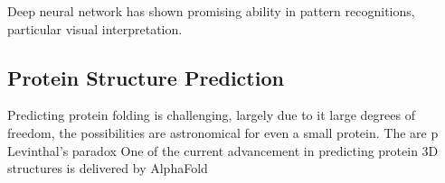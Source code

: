 Deep neural network has shown promising ability in pattern recognitions, particular visual interpretation.
\par 

\subsection{Protein Structure Prediction}
Predicting protein folding is challenging, largely due to it large degrees of freedom, the possibilities are astronomical for even a small protein. The  are p Levinthal's paradox One of the current advancement in predicting protein 3D structures is delivered by AlphaFold